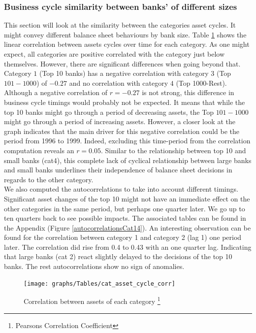 \documentclass[12pt, a4paper]{article} %
\begin{document}
\subsubsection{Business cycle similarity between banks' of different sizes}
This section will look at the similarity between the categories asset cycles. It might convey different balance sheet behaviours by bank size. Table \ref{table:cat_assets_corr} shows the linear correlation between assets cycles over time for each category. As one might expect, all categories are positive correlated with the category just below themselves. However, there are significant differences when going beyond that. Category $1$ (Top 10 banks) has a negative correlation with category $3$ (Top $101-1000$) of $-0.27$ and no correlation with category $4$ (Top 1000-Rest). Although a negative correlation of $r=-0.27$ is not strong, this difference in business cycle timings would probably not be expected. It means that while the top 10 banks might go through a period of decreasing assets, the Top $101-1000$ might go through a period of increasing assets. However, a closer look at the graph indicates that the main driver for this negative correlation could be the period from 1996 to 1999. Indeed, excluding this time-period from the correlation computation reveals an $r=0.05$. Similar to the relationship between top 10 and small banks (cat4), this complete lack of cyclical relationship between large banks and small banks underlines their independence of balance sheet decisions in regards to the other category.\\
We also computed the autocorrelations to take into account different timings. Significant asset changes of the top 10 might not have an immediate effect on the other categories in the same period, but perhaps one quarter later. We go up to ten quarters back to see possible impacts. The associated tables can be found in the Appendix (Figure \ref{autocorrelationsCat14}). An interesting observation can be found for the correlation between category 1 and category 2 (lag 1) one period later. The correlation did rise from 0.4 to 0.43 with an one quarter lag. Indicating that large banks (cat 2) react slightly delayed to the decisions of the top 10 banks. The rest autocorrelations show no sign of anomalies.



\begin{figure}[H]
\begin{minipage}{\textwidth}
\centering
\caption[1]{Correlation between assets of each category \footnote{Pearsons Correlation Coefficient} }
\texttt{[image: graphs/Tables/cat\_asset\_cycle\_corr]}
\label{table:cat_assets_corr}
\end{minipage}
\end{figure} 
\end{document}
